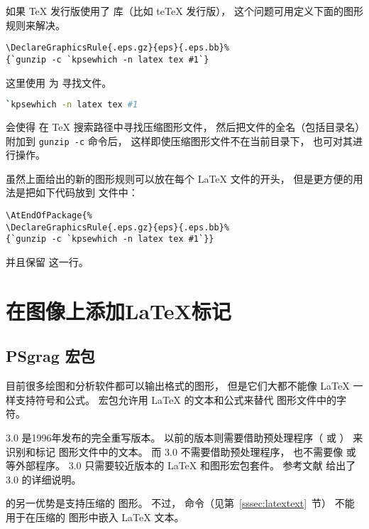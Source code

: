 如果 \TeX{} 发行版使用了  库（比如 te\TeX{} 发行版），
这个问题可用定义下面的图形规则来解决。
\begin{lstlisting}
\DeclareGraphicsRule{.eps.gz}{eps}{.eps.bb}%
{`gunzip -c `kpsewhich -n latex tex #1`}
\end{lstlisting}
这里使用  为  寻找文件。
\begin{lstlisting}[language=bash]
`kpsewhich -n latex tex #1
\end{lstlisting}
会使得  在 \TeX{} 搜索路径中寻找压缩图形文件，
然后把文件的全名（包括目录名）附加到 \texttt{gunzip -c} 命令后，
这样即使压缩图形文件不在当前目录下， 也可对其进行操作。

虽然上面给出的新的图形规则可以放在每个 \LaTeX{} 文件的开头，
但是更方便的用法是把如下代码放到  文件中：
\begin{lstlisting}
\AtEndOfPackage{%
\DeclareGraphicsRule{.eps.gz}{eps}{.eps.bb}%
{`gunzip -c `kpsewhich -n latex tex #1`}}
\end{lstlisting}
并且保留  这一行。


\section{在图像上添加\LaTeX{}标记}\label{sec:graphics-text}

\subsection{PSgrag 宏包}\label{ssec:psfrag}

目前很多绘图和分析软件都可以输出格式的图形，
但是它们大都不能像 \LaTeX{} 一样支持符号和公式。
 宏包允许用 \LaTeX{} 的文本和公式来替代  图形文件中的字符。

 3.0 是1996年发布的完全重写版本。
以前的版本则需要借助预处理程序（ 或 ）
来识别和标记  图形文件中的文本。
而 3.0 不需要借助预处理程序，
也不需要像  或  等外部程序。
 3.0 只需要较近版本的 \LaTeX{} 和图形宏包套件。
参考文献 \cite{psfrag-doc} 给出了 3.0 的详细说明。

 的另一优势是支持压缩的  图形。
不过， 命令（见第~\ref{sssec:latextext}~节）
不能用于在压缩的  图形中嵌入 \LaTeX{} 文本。


